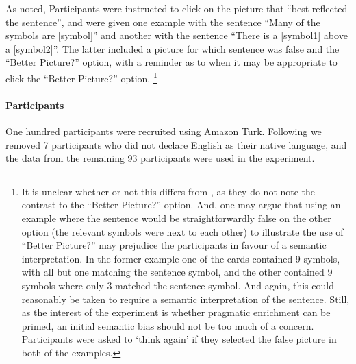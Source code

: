 \documentclass[10pt]{article}
\begin{document}
\begin{multicols}{2}
As noted, Participants were instructed to click on the picture that ``best reflected the sentence'', and were given one example with the sentence ``Many of the symbols are [symbol]'' and another with the sentence ``There is a [symbol1] above a [symbol2]''.
The latter included a picture for which sentence was false and the ``Better Picture?'' option, with a reminder as to when it may be appropriate to click the ``Better Picture?'' option.\nolinebreak
\footnote{It is unclear whether or not this differs from \citeauthor{Bott:2016aa}, as they do not note the contrast to the ``Better Picture?'' option.
  And, one may argue that using an example where the sentence would be straightforwardly false on the other option (the relevant symbols were next to each other) to illustrate the use of ``Better Picture?'' may prejudice the participants in favour of a semantic interpretation.
  In the former example one of the cards contained 9 symbols, with all but one matching the sentence symbol, and the other contained 9 symbols where only 3 matched the sentence symbol.
  And again, this could reasonably be taken to require a semantic interpretation of the sentence.
  Still, as the interest of the experiment is whether pragmatic enrichment can be primed, an initial semantic bias should not be too much of a concern.
  Participants were asked to `think again' if they selected the false picture in both of the examples.
}

\paragraph{Participants}

One hundred participants were recruited using Amazon Turk.
Following \citeauthor{Bott:2016aa} we removed 7 participants who did not declare English as their native language, and the data from the remaining 93 participants were used in the experiment.


\end{multicols}
\end{document}
